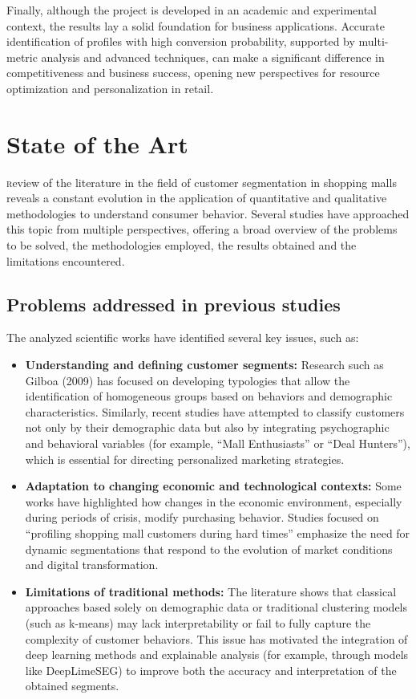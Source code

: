 \documentclass[10pt]{article}
\newcommand*\initfamily{\usefont{U}{GoudyIn}{xl}{n}}
\begin{document}
Finally, although the project is developed in an academic and experimental context, the results lay a solid foundation for business applications. Accurate identification of profiles with high conversion probability, supported by multi-metric analysis and advanced techniques, can make a significant difference in competitiveness and business success, opening new perspectives for resource optimization and personalization in retail.

\section{State of the Art}
\vspace{10pt}
\lettrine[lines=3, loversize=0.01, lhang=0.01]{\scalebox{0.9}{\initfamily A}} review of the literature in the field of customer segmentation in shopping malls reveals a constant evolution in the application of quantitative and qualitative methodologies to understand consumer behavior. Several studies have approached this topic from multiple perspectives, offering a broad overview of the problems to be solved, the methodologies employed, the results obtained and the limitations encountered.

\subsection{Problems addressed in previous studies}

The analyzed scientific works have identified several key issues, such as:

\begin{itemize}
    \item \textbf{Understanding and defining customer segments:} Research such as Gilboa (2009) has focused on developing typologies that allow the identification of homogeneous groups based on behaviors and demographic characteristics. Similarly, recent studies have attempted to classify customers not only by their demographic data but also by integrating psychographic and behavioral variables (for example, “Mall Enthusiasts” or “Deal Hunters”), which is essential for directing personalized marketing strategies.
    
    \item \textbf{Adaptation to changing economic and technological contexts:} Some works have highlighted how changes in the economic environment, especially during periods of crisis, modify purchasing behavior. Studies focused on “profiling shopping mall customers during hard times” emphasize the need for dynamic segmentations that respond to the evolution of market conditions and digital transformation.
    
    \item \textbf{Limitations of traditional methods:} The literature shows that classical approaches based solely on demographic data or traditional clustering models (such as k-means) may lack interpretability or fail to fully capture the complexity of customer behaviors. This issue has motivated the integration of deep learning methods and explainable analysis (for example, through models like DeepLimeSEG) to improve both the accuracy and interpretation of the obtained segments.
\end{itemize}
\end{document}
